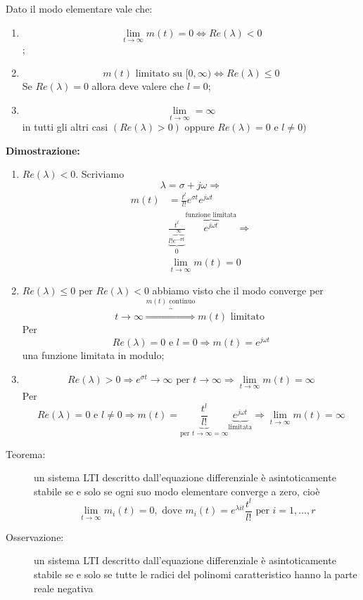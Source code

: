 \documentclass[a4paper, 12pt]{book}
\theoremstyle{plain}
\begin{document}
Dato il modo elementare vale che:

\begin{enumerate}
    \item \[\lim_{t \rightarrow \infty} m(t) = 0 \Leftrightarrow Re(\lambda) < 0\];
    \item \[m(t) \textrm{ limitato su } [0, \infty) \Leftrightarrow Re(\lambda) \le 0\] Se $Re(\lambda) = 0$ allora deve valere che $l = 0$;
    \item \[\lim_{t \rightarrow \infty} = \infty\] in tutti gli altri casi $(Re(\lambda) > 0)$ oppure $Re(\lambda) = 0$ e $l \neq 0)$
\end{enumerate}

\textbf{Dimostrazione:}

\begin{enumerate}
    \item $Re(\lambda) < 0$. Scriviamo \[\lambda = \sigma + j\omega \Rightarrow\] \[\begin{split}
        m(t) &= \frac{t^l}{l!}e^{\sigma t}e^{j\omega t} \\
        &\underbrace{\frac{t^l}{l!\overbrace{e^{-\sigma t}}^{\infty}}}_0 \overbrace{e^{j\omega t}}^{\textrm{funzione limitata}} \Rightarrow \\
        &\lim_{t \rightarrow \infty} m(t) = 0
    \end{split}\]
    \item $Re(\lambda) \le 0$ per $Re(\lambda) < 0$  abbiamo visto che il modo converge per \[t \rightarrow \infty \overbrace{\Rightarrow}^{m(t) \textrm{ continuo}} m(t) \textrm{ limitato }\] Per \[Re(\lambda) = 0 \textrm{ e } l = 0 \Rightarrow m(t) = e^{j\omega t}\] una funzione limitata in modulo;
    \item \[Re(\lambda) > 0 \Rightarrow e^{\sigma t} \rightarrow \infty \textrm{ per } t \rightarrow \infty \Rightarrow \lim_{t \rightarrow \infty} m(t) = \infty\] Per \[Re(\lambda) = 0 \textrm{ e } l \neq 0 \Rightarrow m(t) = \underbrace{\frac{t^l}{l!}}_{\textrm{per } t\rightarrow \infty = \infty} \underbrace{e^{j\omega t}}_{\textrm{limitata}} \Rightarrow \lim_{t \rightarrow \infty} m(t) = \infty\]
\end{enumerate}

\begin{description}
    \item[Teorema:] un sistema LTI descritto dall'equazione differenziale è asintoticamente stabile se e solo se ogni suo modo elementare converge a zero, cioè \[\lim_{t \rightarrow \infty} m_i(t) = 0, \textrm{ dove } m_i(t) = e^{\lambda it} \frac{t^l}{l!} \textrm{ per } i = 1, \dots, r\]
    \item[Osservazione:] un sistema LTI descritto  dall'equazione differenziale è asintoticamente stabile se e solo se tutte le radici del polinomi caratteristico hanno la parte reale negativa
\end{description}
\end{document}
